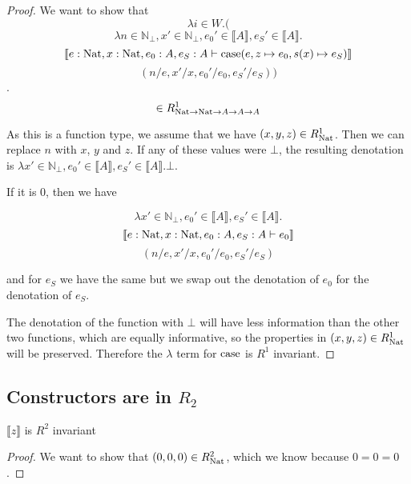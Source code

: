 \vspace{0.25cm}

\begin{proof}

 We want to show that 
 \[ \lambda i \in W. (\]
\[\lambda n \in \mathbb{N}_{\bot}, x' \in \mathbb{N}_{\bot}, e_0' \in \llbracket A \rrbracket ,  e_S' \in \llbracket A \rrbracket .\]
\[ \llbracket e : \operatorname{Nat}, x : \operatorname{Nat}, e_0 : A , e_S : A \vdash \operatorname{case} (e, z \mapsto e_0, s(x) \mapsto e_S) \rrbracket\]
\[ (n/e, x'/x, e_0'/e_0, e_S'/e_S))\].
\[ \in R_{\operatorname{Nat} \to \operatorname{Nat} \to A \to A \to A}^1\]

As this is a function type, we assume that we have $(x,y,z) \in R_{\operatorname{Nat}}^1$. Then we can replace $n$ with $x$, $y$ and $z$. If any of these values were $\bot$, the resulting denotation is $\lambda x' \in \mathbb{N}_{\bot}, e_0' \in \llbracket A \rrbracket ,  e_S' \in \llbracket A \rrbracket . \bot$.

If it is $0$, then we have 

\[ \lambda x' \in \mathbb{N}_{\bot}, e_0' \in \llbracket A \rrbracket ,  e_S' \in \llbracket A \rrbracket .\] \[\llbracket e : \operatorname{Nat}, x : \operatorname{Nat}, e_0 : A , e_S : A \vdash e_0 \rrbracket\]
\[ (n/e, x'/x, e_0'/e_0, e_S'/e_S)\]

and for $e_S$ we have the same but we swap out the denotation of $e_0$ for the denotation of $e_S$.

The denotation of the function with $\bot$ will have less information than the other two functions, which are equally informative, so the properties in $(x,y,z) \in R_{\operatorname{Nat}}^1$ will be preserved. Therefore the $\lambda$ term for $\operatorname{case}$ is $R^1$ invariant.
\end{proof}



\subsection{Constructors are in $R_2$}

\begin{lem}
$\llbracket z \rrbracket$ is $R^2$ invariant
\end{lem}

\vspace{0.25cm}

\begin{proof}
We want to show that $(0,0,0) \in R_{\operatorname{Nat}}^2$, which we know because $0=0=0$.
\end{proof}

\vspace{0.5cm}

